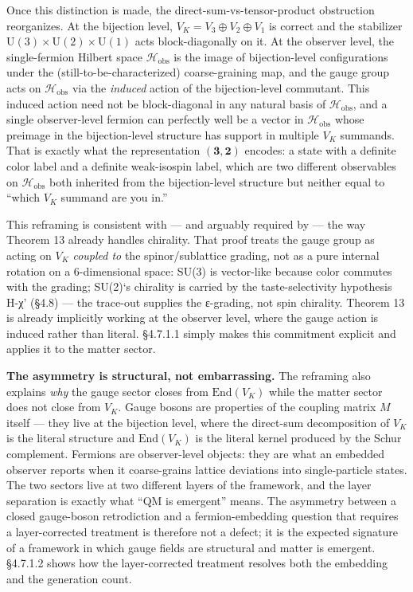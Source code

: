 \documentclass[
]{article}
\begin{document}
Once this distinction is made, the direct-sum-vs-tensor-product
obstruction reorganizes. At the bijection level,
\(V_K = V_3 \oplus V_2 \oplus V_1\) is correct and the stabilizer
\(\mathrm{U}(3) \times \mathrm{U}(2) \times \mathrm{U}(1)\) acts
block-diagonally on it. At the observer level, the single-fermion
Hilbert space \(\mathcal{H}_{\text{obs}}\) is the image of
bijection-level configurations under the (still-to-be-characterized)
coarse-graining map, and the gauge group acts on
\(\mathcal{H}_{\text{obs}}\) via the \emph{induced} action of the
bijection-level commutant. This induced action need not be
block-diagonal in any natural basis of \(\mathcal{H}_{\text{obs}}\), and
a single observer-level fermion can perfectly well be a vector in
\(\mathcal{H}_{\text{obs}}\) whose preimage in the bijection-level
structure has support in multiple \(V_K\) summands. That is exactly what
the representation \((\mathbf{3}, \mathbf{2})\) encodes: a state with a
definite color label and a definite weak-isospin label, which are two
different observables on \(\mathcal{H}_{\text{obs}}\) both inherited
from the bijection-level structure but neither equal to ``which \(V_K\)
summand are you in.''

This reframing is consistent with --- and arguably required by --- the
way Theorem 13 already handles chirality. That proof treats the gauge
group as acting on \(V_K\) \emph{coupled to} the spinor/sublattice
grading, not as a pure internal rotation on a 6-dimensional space: SU(3)
is vector-like because color commutes with the grading; SU(2)`s
chirality is carried by the taste-selectivity hypothesis H-χ' (§4.8) ---
the trace-out supplies the ε-grading, not spin chirality. Theorem 13 is
already implicitly working at the observer level, where the gauge action
is induced rather than literal. §4.7.1.1 simply makes this commitment
explicit and applies it to the matter sector.

\textbf{The asymmetry is structural, not embarrassing.} The reframing
also explains \emph{why} the gauge sector closes from
\(\mathrm{End}(V_K)\) while the matter sector does not close from
\(V_K\). Gauge bosons are properties of the coupling matrix \(M\) itself
--- they live at the bijection level, where the direct-sum decomposition
of \(V_K\) is the literal structure and \(\mathrm{End}(V_K)\) is the
literal kernel produced by the Schur complement. Fermions are
observer-level objects: they are what an embedded observer reports when
it coarse-grains lattice deviations into single-particle states. The two
sectors live at two different layers of the framework, and the layer
separation is exactly what ``QM is emergent'' means. The asymmetry
between a closed gauge-boson retrodiction and a fermion-embedding
question that requires a layer-corrected treatment is therefore not a
defect; it is the expected signature of a framework in which gauge
fields are structural and matter is emergent. §4.7.1.2 shows how the
layer-corrected treatment resolves both the embedding and the generation
count.
\end{document}
